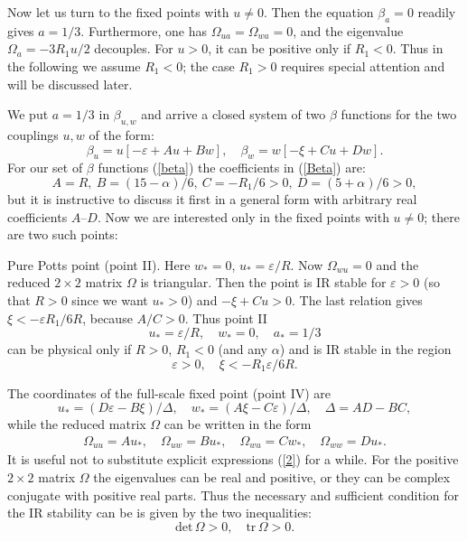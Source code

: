 \documentclass[12pt]{iopart}
\begin{document}
Now let us turn to the fixed points with $u\ne0$. Then the equation
$\beta_{a}=0$ readily gives $a=1/3$. Furthermore, one has
$\Omega_{ua}=\Omega_{wa}=0$, and the eigenvalue $\Omega_{a}= - 3R_{1}u/2$
decouples. For $u>0$, it can be positive only if $R_{1}<0$. Thus in the
following we assume $R_{1}<0$; the case $R_{1}>0$ requires special attention
and will be discussed later.

We put $a=1/3$ in $\beta_{u,w}$ and arrive a closed system of two
$\beta$ functions for the two couplings $u,w$ of the form:
\begin{equation}
\beta_{u} = u [-\varepsilon+ Au + Bw], \quad \beta_{w} = w [-\xi+ Cu + Dw].
\label{Beta}
\end{equation}
For our set of $\beta$ functions (\ref{beta}) the coefficients in
(\ref{Beta}) are:
\begin{equation}
A=R, \ B=(15-\alpha)/6, \ C=-R_{1}/6>0, \ D=(5+\alpha)/6>0,
\label{ABC}
\end{equation}
but it is instructive to discuss it first in a general form with arbitrary
real coefficients $A$--$D$. Now we are interested only in the fixed points
with $u\ne0$; there are two such points:

Pure Potts point (point II). Here $w_{*}=0$, $u_{*} = \varepsilon/R$. Now
$\Omega_{wu}=0$ and the reduced $2\times2$ matrix $\Omega$ is triangular.
Then the point is IR stable for $\varepsilon>0$ (so that $R>0$ since we want
$u_{*}>0$) and $-\xi+Cu>0$. The last relation gives
$\xi< - \varepsilon R_{1}  /6R$, because $A/C>0$.
Thus point II
\[ u_{*} = \varepsilon/R, \quad w_{*}=0, \quad a_{*}=1/3 \]
can be physical only if $R>0$, $R_{1}<0$ (and any $\alpha$) and is IR
stable in the region
\begin{equation}
 \varepsilon>0, \quad \xi< -R_{1} \varepsilon /6R.
\label{Tri}
\end{equation}

The coordinates of the full-scale fixed point (point IV) are
\begin{equation}
u_{*}= (D\varepsilon - B\xi )/\Delta, \quad
w_{*}= (A\xi - C\varepsilon )/\Delta,
\quad \Delta = AD-BC,
\label{2}
\end{equation}
while the reduced matrix $\Omega$ can be written in the form
\begin{eqnarray}
\Omega_{uu}=Au_{*}, \quad
\Omega_{uw}= Bu_{*}, \quad
\Omega_{wu}= Cw_{*}, \quad
\Omega_{ww}= Du_{*}.
\label{3}
\end{eqnarray}
It is useful not to substitute explicit expressions (\ref{2}) for a while.
For the positive $2\times2$ matrix $\Omega$ the eigenvalues can be real and
positive, or they can be complex conjugate with positive real parts.
Thus the necessary and sufficient condition for the IR stability
can be is given by the two inequalities:
\begin{equation}
\textrm{det}\, \Omega>0, \quad \textrm{tr} \,\Omega >0.
\label{5}
\end{equation}
\end{document}
